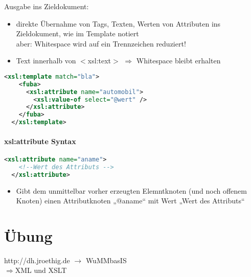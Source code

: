 Ausgabe ins Zieldokument:
\begin{itemize}
\item direkte Übernahme von Tags, Texten, Werten von Attributen ins Zieldokument, wie im Template notiert\\
aber: Whitespace wird auf ein Trennzeichen reduziert!
\item Text innerhalb von $<$xsl:text$>$ $\Rightarrow$ Whitespace bleibt erhalten
\end{itemize}

\begin{lstlisting}[caption={Beispiel für Variable in Template}, label={lst:xsl:variable_in_template}, language={XML}]
  <xsl:template match="bla">
    <fuba>
      <xsl:attribute name="automobil">
        <xsl:value-of select="@wert" />
      </xsl:attribute>
    </fuba>
  </xsl:template>
\end{lstlisting}

\paragraph{xsl:attribute Syntax}\hspace{1mm}
\begin{lstlisting}[caption={xsl:sort Syntax}, label={lst:xsl:sort}, language={XML}]
  <xsl:attribute name="aname">
    <!--Wert des Attributs -->
  </xsl:attribute>
\end{lstlisting}
\begin{itemize}
\item Gibt dem unmittelbar vorher erzeugten Elemntknoten (und noch offenem Knoten) einen Attributknoten „@aname“ mit Wert „Wert des Attributs“
\end{itemize}

\section{Übung}
http://dh.jroethig.de $\rightarrow$ WuMMbasIS\\
$\Rightarrow$XML und XSLT